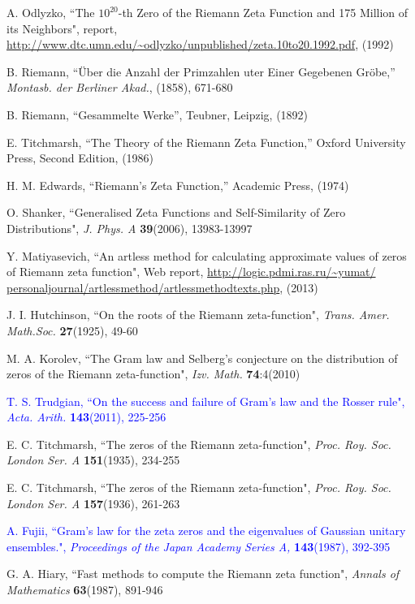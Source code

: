 \documentclass[twoside]{article}
\theoremstyle{definition}
\begin{document}
{\begin{thebibliography} {}
  A. Odlyzko,
``The $10^{20}$-th Zero of the Riemann Zeta
Function and 175 Million of its Neighbors", report,
\url{http://www.dtc.umn.edu/~odlyzko/unpublished/zeta.10to20.1992.pdf}, (1992)


 B. Riemann, ``\"{U}ber die Anzahl der Primzahlen uter
Einer Gegebenen Gr\"{o}be,'' {\it Montasb. der Berliner Akad.}, (1858),
671-680

 B. Riemann, ``Gesammelte Werke'', Teubner, Leipzig, (1892)

 E. Titchmarsh, ``The Theory of the Riemann Zeta
Function,'' Oxford University Press, Second Edition, (1986)

 H. M. Edwards, ``Riemann's Zeta Function,''
Academic Press,  (1974)

 O. Shanker, 
``Generalised Zeta Functions and Self-Similarity of Zero Distributions",
{\it J.  Phys. A} {\bf39}(2006), 13983-13997

 Y. Matiyasevich, 
``An artless method for calculating approximate values of
zeros of Riemann zeta function",
Web report, \url{http://logic.pdmi.ras.ru/~yumat/
personaljournal/artlessmethod/artlessmethodtexts.php}, (2013)

 J. I. Hutchinson,
``On the roots of the Riemann zeta-function",
{\it Trans. Amer. Math.Soc.} {\bf27}(1925), 49-60

 M. A. Korolev,
``The Gram law and Selberg's conjecture on the distribution of zeros
of the Riemann zeta-function",
{\it Izv. Math.} {\bf74}:4(2010)

\textcolor{blue}{ T. S. Trudgian,
``On the success and failure of Gram's law and the Rosser rule",
{\it Acta. Arith.} {\bf143}(2011), 225-256}

 E. C. Titchmarsh,
``The zeros of the Riemann zeta-function",
{\it Proc. Roy. Soc. London Ser. A} {\bf151}(1935), 234-255

 E. C. Titchmarsh,
``The zeros of the Riemann zeta-function",
{\it Proc. Roy. Soc. London Ser. A} {\bf157}(1936), 261-263

\textcolor{blue}{ A. Fujii,
``Gram's law for the zeta zeros and the eigenvalues of Gaussian
unitary ensembles.",
{\it Proceedings of the Japan Academy Series A,} {\bf143}(1987), 392-395}

 G. A. Hiary,
``Fast methods to compute the Riemann zeta function",
{\it Annals of Mathematics} {\bf63}(1987), 891-946


\end{thebibliography}}
\end{document}
